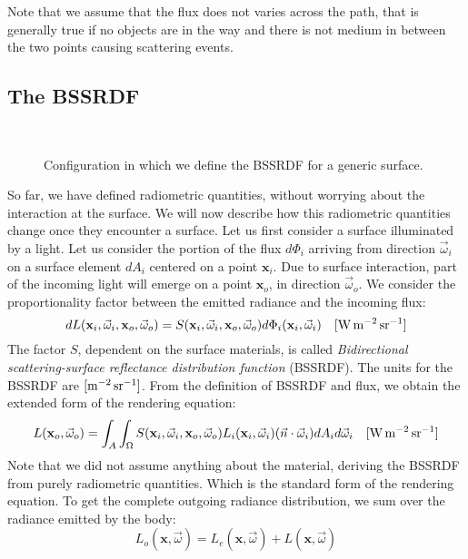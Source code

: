 Note that we assume that the flux does not varies across the path, that is generally true if no objects are in the way and there is not medium in between the two points causing scattering events. 

\subsection{The BSSRDF}

\begin{figure}
\centering
   \def\svgwidth{0.4\textwidth}
    \\
\caption{Configuration in which we define the BSSRDF for a generic surface.} %
\label{fig:bssrdf_configuration}
\end{figure}


So far, we have defined radiometric quantities, without worrying about the interaction at the surface. We will now describe how this radiometric quantities change once they encounter a surface. Let us first consider a surface illuminated by a light. Let us consider the portion of the flux $d \Phi_i$ arriving from direction $\vec{\omega}_i$ on a surface element $d A_i$ centered on a point $\mathbf{x}_i$. Due to surface interaction, part of the incoming light will emerge on a point $\mathbf{x}_o$, in direction $\vec{\omega}_o$. We consider the proportionality factor between the emitted radiance and the incoming flux:
\begin{equation}
\label{eq:bssrdf}
d L(\mathbf{x}_i, \vec{\omega}_i, \mathbf{x}_o, \vec{\omega}_o) = S(\mathbf{x}_i, \vec{\omega}_i, \mathbf{x}_o, \vec{\omega}_o) d \Phi_i(\mathbf{x}_i, \vec{\omega}_i)  \siunit{\watt \per \square \metre \per \steradian}
\end{equation}
The factor $S$, dependent on the surface materials, is called \emph{Bidirectional scattering-surface reflectance distribution function} (BSSRDF). The units for the BSSRDF are $\siunitnospace{\per \square \metre \per \steradian}$. From the definition of BSSRDF and flux, we obtain the extended form of the rendering equation:
\begin{equation}
\label{eq:bssrdfintegral}
L(\mathbf{x}_o, \vec{\omega}_o) = \int_A \int_\Omega S(\mathbf{x}_i, \vec{\omega}_i, \mathbf{x}_o, \vec{\omega}_o) L_i(\mathbf{x}_i, \vec{\omega}_i) (\vec{n} \cdot \vec{\omega}_i) d A_i d \vec{\omega}_i  \siunit{\watt \per \square \metre \per \steradian}
\end{equation}
Note that we did not assume anything about the material, deriving the BSSRDF from purely radiometric quantities. 
Which is the standard form of the rendering equation. To get the complete outgoing radiance distribution, we sum over the radiance emitted by the body:
\begin{equation*}
L_o(\mathbf{x}, \vec{\omega}) = L_e(\mathbf{x}, \vec{\omega}) + L(\mathbf{x}, \vec{\omega}) 
\end{equation*}

